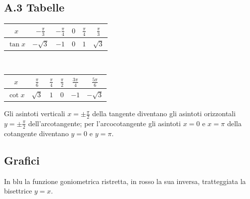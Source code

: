 \documentclass[11pt,a4paper]{article}
\begin{document}
\subsection*{A.3 Tabelle}
\begin{center}
\renewcommand{\arraystretch}{1.5}
\begin{tabular}{|c|*{5}{c|}}
\hline
$x$ & $-\frac{\pi}{3}$ & $-\frac{\pi}{4}$ & $0$ & $\frac{\pi}{4}$ & $\frac{\pi}{3}$\\\hline
$\tan x$ & $-\sqrt3$ & $-1$ & $0$ & $1$ & $\sqrt3$\\\hline
\end{tabular}
\\[6pt]
\begin{tabular}{|c|*{5}{c|}}
\hline
$x$ & $\frac{\pi}{6}$ & $\frac{\pi}{4}$ & $\frac{\pi}{2}$ & $\frac{3\pi}{4}$ & $\frac{5\pi}{6}$\\\hline
$\cot x$ & $\sqrt3$ & $1$ & $0$ & $-1$ & $-\sqrt3$\\\hline
\end{tabular}
\end{center}
Gli asintoti verticali $x=\pm\frac{\pi}{2}$ della tangente diventano gli asintoti orizzontali $y=\pm\frac{\pi}{2}$ dell'arcotangente; per l'arcocotangente gli asintoti $x=0$ e $x=\pi$ della cotangente diventano $y=0$ e $y=\pi$.

\subsection*{Grafici}
In blu la funzione goniometrica ristretta, in rosso la sua inversa, tratteggiata la bisettrice $y=x$.
\end{document}
